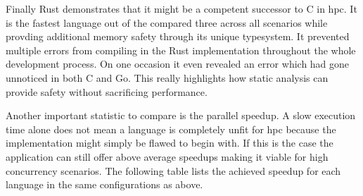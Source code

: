 Finally Rust demonstrates that it might be a competent successor to C in \gls{hpc}. It is the fastest language out of the compared three across all scenarios while provding additional memory safety through its unique typesystem. It prevented multiple errors from compiling in the Rust implementation throughout the whole development process. On one occasion it even revealed an error which had gone unnoticed in both C and Go. This really highlights how static analysis can provide safety without sacrificing performance.

Another important statistic to compare is the parallel speedup. A slow execution time alone does not mean a language is completely unfit for \gls{hpc} because the implementation might simply be flawed to begin with. If this is the case the application can still offer above average speedups making it viable for high concurrency scenarios. The following table lists the achieved speedup for each language in the same configurations as above.

